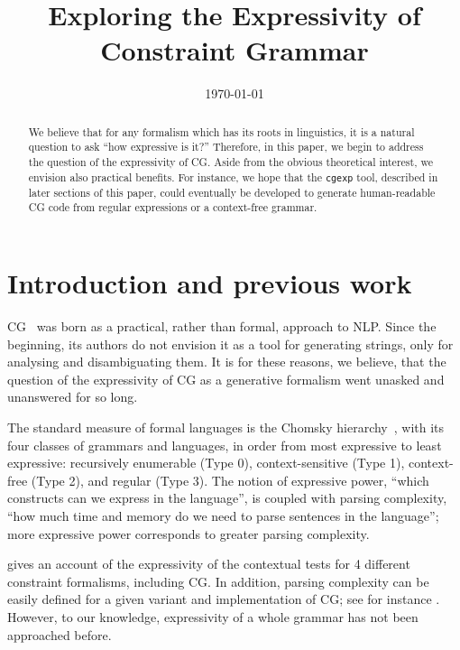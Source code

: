 \documentclass[11pt]{article}
\title{Exploring the Expressivity of Constraint Grammar}
\date{\today}
\begin{document}
\maketitle

\begin{abstract}
  We believe that for any formalism which has its roots in linguistics, it is a
  natural question to ask ``how expressive is it?'' Therefore, in this paper, we
  begin to address the question of the expressivity of CG.
  Aside from the obvious theoretical interest, we envision also practical
  benefits. For instance, we hope that the \texttt{cgexp} tool, described in
  later sections of this paper, could eventually be developed to generate
  human-readable CG code from regular expressions or a context-free grammar. 
\end{abstract}

\section{Introduction and previous work}

CG~\cite{karlsson1995constraint} was born as a practical, rather than formal, 
approach to NLP. 
Since the beginning, its authors do not envision it as a tool for 
generating strings, only for analysing and disambiguating them.
It is for these reasons, we believe, that the question of the expressivity of CG
as a generative formalism went unasked and unanswered for so long.

The standard measure of formal languages is the Chomsky
hierarchy~\cite{chomsky1956hierarchy}, with its four classes of grammars and
languages, in order from most expressive to least expressive: recursively
enumerable (Type 0), context-sensitive (Type 1), context-free (Type 2), and
regular (Type 3). The notion of expressive power, ``which constructs can we
express in the language'', is coupled with parsing complexity, ``how much time
and memory do we need to parse sentences in the language''; more expressive
power corresponds to greater parsing complexity.


 gives an account of the expressivity of
the contextual tests for 4 different constraint formalisms, including CG. 
In addition, parsing complexity can be easily defined for a given variant and 
implementation of CG; see for instance .
However, to our knowledge, expressivity of a whole grammar has not been approached before.
\end{document}
